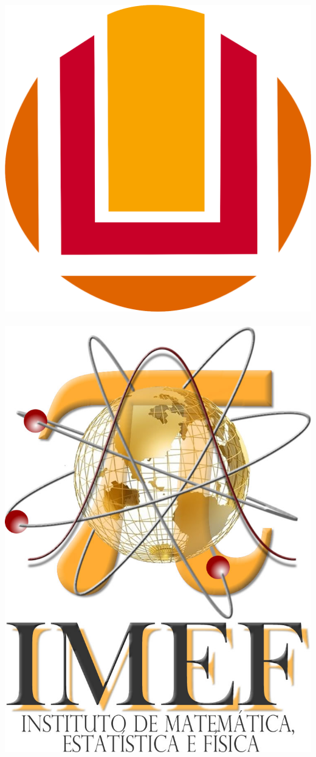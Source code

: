 \documentclass[12pt, a4paper]{report}
\begin{document}

\pagestyle{empty}
\hbox {
\includegraphics[scale=0.18]{furgGM.png}
\hspace{10cm}
\includegraphics[scale=0.08]{logo_variao.jpg}}
\end{document}

